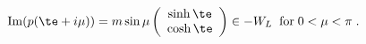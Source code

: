 \begin{equation*}
  \mathrm{Im}(p(\te + i\mu)) = m\sin\mu\left(
    \begin{array}{c}
      \sinh\te\\\cosh\te
    \end{array}
\right) \in -W_L\;\;\mathrm{for}\; 0<\mu<\pi\;.
\end{equation*}

